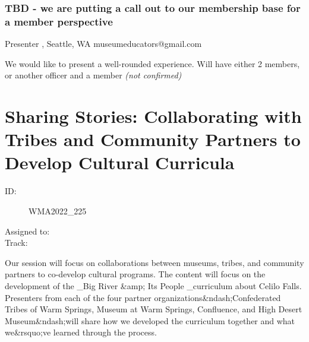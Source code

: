 \documentclass{report}
\begin{document}
              
                \subsubsection*{  TBD - we are putting a call out to our membership base for a member perspective  }
                Presenter\newline
                \newline
                , Seattle, WA 
                \newline
                museumeducators@gmail.com\newline
                
                

                We would like to present a well-rounded experience. Will have either 2 members, or another officer and a member
                \emph{ (not confirmed) }
              

              

              
        
          \newpage
          \section{ Sharing Stories: Collaborating with Tribes and Community Partners to Develop Cultural Curricula }
            \begin{description}
              \item [ID:]
              WMA2022\_225

              \item [Assigned to:]
                \item [Track:]
              \end{description}

              Our session will focus on collaborations between museums, tribes, and community partners to co-develop cultural programs. The content will focus on the development of the \_Big River \&amp; Its People \_curriculum about Celilo Falls. Presenters from each of the four partner organizations\&ndash;Confederated Tribes of Warm Springs, Museum at Warm Springs, Confluence, and High Desert Museum\&ndash;will share how we developed the curriculum together and what we\&rsquo;ve learned through the process.
\end{document}
